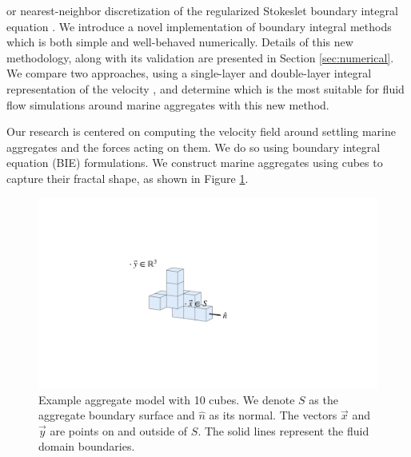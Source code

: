 or  nearest-neighbor discretization of the regularized Stokeslet boundary integral equation \cite{smith_nearest-neighbour_2018}.
 We introduce a novel implementation of boundary integral methods which is both simple  and well-behaved numerically. 
Details of this new methodology, along with its validation are presented in Section \ref{sec:numerical}. We compare two approaches, using a single-layer and double-layer integral representation of the velocity \cite{pozrikidis_boundary_1992, power_second_1987, ingber_comparison_1999}, and determine which is the most suitable for fluid flow simulations around marine aggregates with this new method.


 \par
Our research is centered on computing the velocity field around settling marine aggregates and the forces acting on them. We do so using boundary integral equation (BIE) formulations. We construct marine aggregates using cubes to capture their fractal shape, as shown in Figure \ref{fig_cube10}. 
\begin{figure}[ht]
	\begin{center}
		\includegraphics[scale=0.25]{figures/fig_sample_cube10.pdf}
	\end{center}
	\caption{Example aggregate model with 10 cubes. We denote $S$ as the aggregate boundary surface and $\hat{n}$ as its normal. The vectors $\vec{x}$ and $\vec{y}$ are points on and outside of $S$. The solid lines represent the fluid domain boundaries.}
	\label{fig_cube10}
\end{figure}
